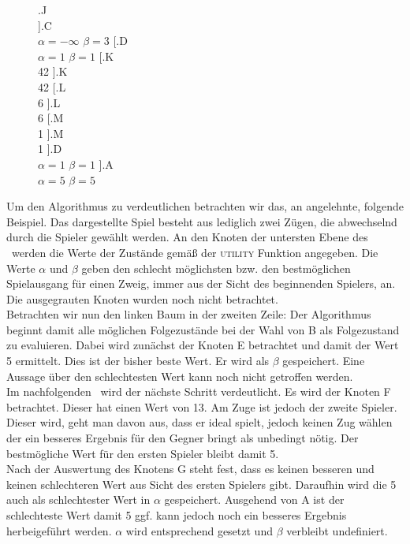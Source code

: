 \begin{figure}[ht!]
		[.{J\\} ].{J\\\grey{42}} 
	].{C\\$\alpha = -\infty$ $\beta = 3$}
	[.{D\\$\alpha = 1$ $\beta = 1$} 
		[.{K\\42} ].{K\\42}
		[.{L\\6} ].{L\\6}
		[.{M\\1} ].{M\\1} 
	].{D\\$\alpha = 1$ $\beta = 1$}  
].{A\\$\alpha = 5$ $\beta = 5$}
\end{figure}
Um den Algorithmus zu verdeutlichen betrachten wir das, an \cite{Russell.2016} angelehnte, folgende Beispiel. Das dargestellte Spiel besteht aus lediglich zwei Zügen, die abwechselnd durch die Spieler gewählt werden. An den Knoten der untersten Ebene des \gtree\ werden die Werte der Zustände gemäß der \textsc{utility} Funktion angegeben. Die Werte $\alpha$ und $\beta$ geben den schlecht möglichsten bzw. den bestmöglichen Spielausgang für einen Zweig, immer aus der Sicht des beginnenden Spielers, an. Die ausgegrauten Knoten wurden noch nicht betrachtet.\\
Betrachten wir nun den linken Baum in der zweiten Zeile: Der Algorithmus beginnt damit alle möglichen Folgezustände bei der Wahl von B als Folgezustand zu evaluieren. Dabei wird zunächst der Knoten E betrachtet und damit der Wert 5 ermittelt. Dies ist der bisher beste Wert. Er wird als $\beta$ gespeichert. Eine Aussage über den schlechtesten Wert kann noch nicht getroffen werden.\\
Im nachfolgenden \gtree\ wird der nächste Schritt verdeutlicht. Es wird der Knoten F betrachtet. Dieser hat einen Wert von 13. Am Zuge ist jedoch der zweite Spieler. Dieser wird, geht man davon aus, dass er ideal spielt, jedoch keinen Zug wählen der ein besseres Ergebnis für den Gegner bringt als unbedingt nötig. Der bestmögliche Wert für den ersten Spieler bleibt damit 5.\\
Nach der Auswertung des Knotens G steht fest, dass es keinen besseren und keinen schlechteren Wert aus Sicht des ersten Spielers gibt. Daraufhin wird die 5 auch als schlechtester Wert in $\alpha$ gespeichert. Ausgehend von A  ist der schlechteste Wert damit 5 ggf. kann jedoch noch ein besseres Ergebnis herbeigeführt werden. $\alpha$ wird entsprechend gesetzt und $\beta$ verbleibt undefiniert.\\
